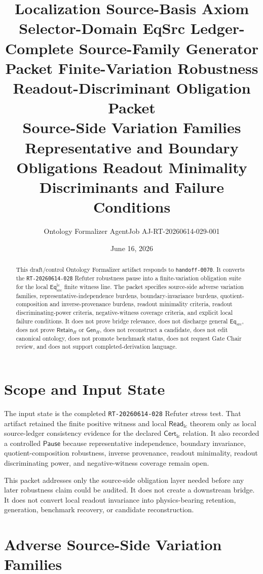 \documentclass[11pt]{article}
\title{\textbf{Localization Source-Basis Axiom Selector-Domain EqSrc Ledger-Complete Source-Family Generator Packet Finite-Variation Robustness Readout-Discriminant Obligation Packet}\\[0.35em]
\large Source-Side Variation Families Representative and Boundary Obligations Readout Minimality Discriminants and Failure Conditions}
\author{Ontology Formalizer AgentJob AJ-RT-20260614-029-001}
\date{June 16, 2026}
\newcommand{\EqSrc}{\mathsf{Eq}_{\mathrm{src}}}
\newcommand{\EqLC}{\mathsf{Eq}_{\mathrm{src}}^{\mathrm{lc}}}
\newcommand{\CertLC}{\mathsf{Cert}_{\mathrm{lc}}}
\newcommand{\ReadLC}{\mathsf{Read}_{\mathrm{lc}}}
\newcommand{\RetainH}{\mathsf{Retain}_{H}}
\newcommand{\GenH}{\mathsf{Gen}_{H}}
\newcommand{\Pause}{\mathsf{Pause}}
\begin{document}
\maketitle

\begin{abstract}
This draft/control Ontology Formalizer artifact responds to
\texttt{handoff-0070}. It converts the \texttt{RT-20260614-028}
Refuter robustness pause into a finite-variation obligation suite for
the local \(\EqLC\) finite witness line. The packet specifies
source-side adverse variation families, representative-independence
burdens, boundary-invariance burdens, quotient-composition and
inverse-provenance burdens, readout minimality criteria, readout
discriminating-power criteria, negative-witness coverage criteria, and
explicit local failure conditions. It does not prove bridge relevance,
does not discharge general \(\EqSrc\), does not prove \(\RetainH\) or
\(\GenH\), does not reconstruct a candidate, does not edit canonical
ontology, does not promote benchmark status, does not request Gate
Chair review, and does not support completed-derivation language.
\end{abstract}

\section{Scope and Input State}

The input state is the completed \texttt{RT-20260614-028} Refuter
stress test. That artifact retained the finite positive witness and
local \(\ReadLC\) theorem only as local source-ledger consistency
evidence for the declared \(\CertLC\) relation. It also recorded a
controlled \(\Pause\) because representative independence, boundary
invariance, quotient-composition robustness, inverse provenance,
readout minimality, readout discriminating power, and negative-witness
coverage remain open.

This packet addresses only the source-side obligation layer needed
before any later robustness claim could be audited. It does not create
a downstream bridge. It does not convert local readout invariance into
physics-bearing retention, generation, benchmark recovery, or candidate
reconstruction.

\section{Adverse Source-Side Variation Families}
\end{document}
